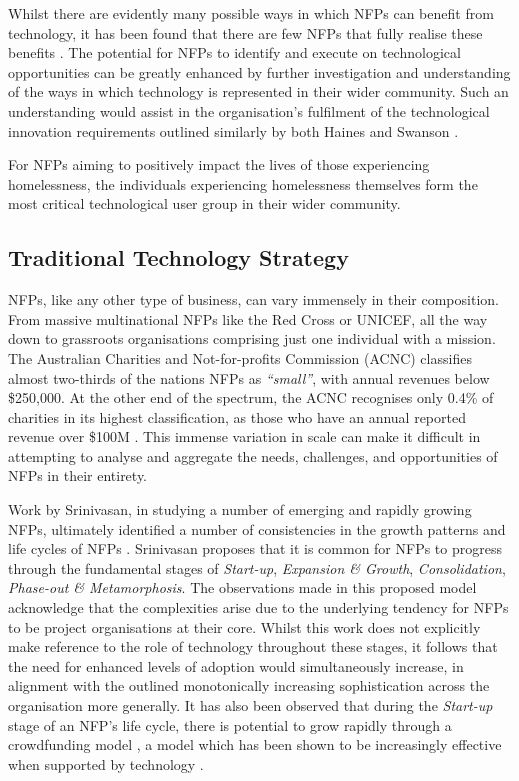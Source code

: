 Whilst there are evidently many possible ways in which NFPs can benefit from technology, it has been found that there are few NFPs that fully realise these benefits \cite{infoxchange_2019}. The potential for NFPs to identify and execute on technological opportunities can be greatly enhanced by further investigation and understanding of the ways in which technology is represented in their wider community. Such an understanding would assist in the organisation's fulfilment of the technological innovation requirements outlined similarly by both Haines \cite{haines2003levels} and Swanson \cite{swanson1994information}.

For NFPs aiming to positively impact the lives of those experiencing homelessness, the individuals experiencing homelessness themselves form the most critical technological user group in their wider community.

\subsection{Traditional Technology Strategy}

NFPs, like any other type of business, can vary immensely in their composition. From massive multinational NFPs like the Red Cross or UNICEF, all the way down to grassroots organisations comprising just one individual with a mission. The Australian Charities and Not-for-profits Commission (ACNC) classifies almost two-thirds of the nations NFPs as \emph{“small”}, with annual revenues below \$250,000. At the other end of the spectrum, the ACNC recognises only 0.4\% of charities in its highest classification, as those who have an annual reported revenue over \$100M \cite{acnc2020}. This immense variation in scale can make it difficult in attempting to analyse and aggregate the needs, challenges, and opportunities of NFPs in their entirety. 

Work by Srinivasan, in studying a number of emerging and rapidly growing NFPs, ultimately identified a number of consistencies in the growth patterns and life cycles of NFPs \cite{srinivasan2007understanding}. Srinivasan proposes that it is common for NFPs to progress through the fundamental stages of \emph{Start-up}, \emph{Expansion \& Growth}, \emph{Consolidation}, \emph{Phase-out \& Metamorphosis}. The observations made in this proposed model acknowledge that the complexities arise due to the underlying tendency for NFPs to be project organisations at their core. Whilst this work does not explicitly make reference to the role of technology throughout these stages, it follows that the need for enhanced levels of adoption would simultaneously increase, in alignment with the outlined monotonically increasing sophistication across the organisation more generally. It has also been observed that during the \emph{Start-up} stage of an NFP's life cycle, there is potential to grow rapidly through a crowdfunding model \cite{paschen2017choose}, a model which has been shown to be increasingly effective when supported by technology \cite{polishchuk2019technology}.

